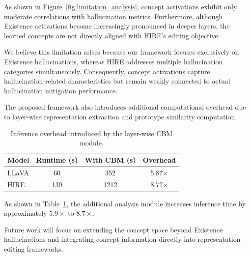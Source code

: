 As shown in Figure~\ref{fig:limitation_analysis}, concept activations exhibit only moderate correlations with hallucination metrics. Furthermore, although Existence activations become increasingly pronounced in deeper layers, the learned concepts are not directly aligned with HIRE's editing objective.

We believe this limitation arises because our framework focuses exclusively on Existence hallucinations, whereas HIRE addresses multiple hallucination categories simultaneously. Consequently, concept activations capture hallucination-related characteristics but remain weakly connected to actual hallucination mitigation performance.

The proposed framework also introduces additional computational overhead due to layer-wise representation extraction and prototype similarity computation.

\begin{table}[t]
\centering
\caption{Inference overhead introduced by the layer-wise CBM module.}
\begin{tabular}{lccc}
\hline
Model & Runtime (s) & With CBM (s) & Overhead \\
\hline
LLaVA & 60 & 352 & 5.87$\times$ \\
HIRE & 139 & 1212 & 8.72$\times$ \\
\hline
\end{tabular}
\label{tab:runtime_results}
\end{table}

As shown in Table~\ref{tab:runtime_results}, the additional analysis module increases inference time by approximately $5.9\times$ to $8.7\times$.

Future work will focus on extending the concept space beyond Existence hallucinations and integrating concept information directly into representation editing frameworks.






